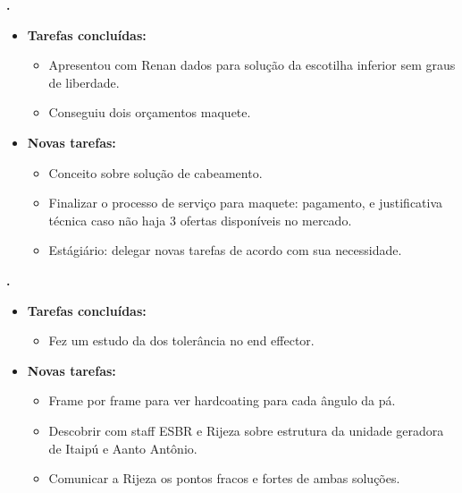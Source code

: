 					
			
   \textbf{.} 
	\begin{itemize}
		\item \textbf{Tarefas concluídas:}
			\begin{itemize}    
				\item Apresentou com Renan dados para solução da escotilha inferior sem
				graus de liberdade.
				\item Conseguiu dois orçamentos maquete.
				
			\end{itemize}
		
		\item \textbf{Novas tarefas:}
			\begin{itemize} 
			    \item Conceito sobre solução de cabeamento.
			    \item Finalizar o processo de serviço para maquete: pagamento, e
			    justificativa técnica caso não haja 3 ofertas disponíveis no mercado.
			    \item Estágiário: delegar novas tarefas de acordo com sua necessidade.
			\end{itemize}
	\end{itemize}

	  \textbf{\renan.} 
	\begin{itemize}
		\item \textbf{Tarefas concluídas:}
			\begin{itemize}    
				\item Fez um estudo da dos tolerância no end effector. 
			\end{itemize}
		
		\item \textbf{Novas tarefas:}
			\begin{itemize} 
			    \item Frame por frame para ver hardcoating para cada ângulo da pá.
			    \item Descobrir com staff ESBR e Rijeza sobre estrutura da unidade
			    geradora de Itaipú e Aanto Antônio.
			    \item Comunicar a Rijeza os pontos fracos e fortes de ambas soluções.
			\end{itemize}
	\end{itemize}	
	
